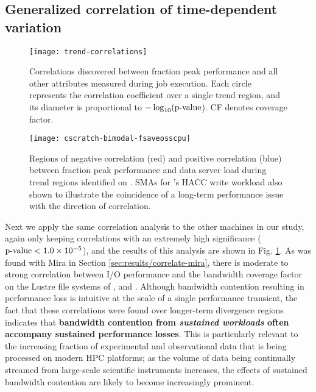 \subsection{Generalized correlation of time-dependent variation} \label{sec:results/correlate-all}




\begin{figure}
    \centering
    \texttt{[image: trend-correlations]}
    \vspace{-.35in}
    \caption{Correlations discovered between fraction peak performance and all other attributes measured during job execution.
    Each circle represents the correlation coefficient over a single trend region, and its diameter is proportional to $-\log_{10}(\textup{p-value}$).
    CF denotes coverage factor.}
    \label{fig:trend-correlations}
\end{figure}


\begin{figure}
    \centering
    \texttt{[image: cscratch-bimodal-fsaveosscpu]}
    \vspace{-.35in}
    \caption{Regions of negative correlation (red) and positive correlation (blue) between fraction peak performance and data server load during trend regions identified on \cori.
    SMAs for \cori's HACC write workload also shown to illustrate the coincidence of a long-term performance issue with the direction of correlation.}
    \label{fig:cscratch-bimodal-fsaveosscpu}
\end{figure}

Next we apply the same correlation analysis to the other machines in our study, again only keeping correlations with an extremely high significance ($\textup{p-value} < {1.0 \times 10^{-5}}$), and the results of this analysis are shown in Fig. \ref{fig:trend-correlations}.
As was found with Mira in Section \ref{sec:results/correlate-mira}, there is moderate to strong correlation between I/O performance and the bandwidth coverage factor on the Lustre file systems of \cori, and \edison.
Although bandwidth contention resulting in performance loss is intuitive at the scale of a single performance transient, the fact that these correlations were found over longer-term divergence regions indicates that \textbf{bandwidth contention from \emph{sustained workloads} often accompany sustained performance losses}.
This is particularly relevant to the increasing fraction of experimental and observational data that is being processed on modern HPC platforms; as the volume of data being continually streamed from large-scale scientific instruments increases, the effects of sustained bandwidth contention are likely to become increasingly prominent.

